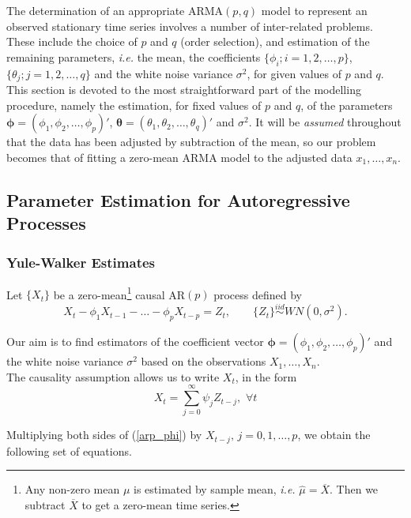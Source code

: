\documentclass[11pt, a4paper]{article}
\numberwithin{equation}{section}
\theoremstyle{definition}
\begin{document}
The determination of an appropriate ARMA$(p, q)$ model to represent an 
observed stationary time series involves a number of inter-related problems. These include the choice of $p$ and $q$ (order selection), and estimation of the remaining parameters, \textit{i.e.} the mean, the coefficients $\{\phi_i; i = 1, 2, \ldots, p\}$, $\{\theta_j; j = 1, 2, \ldots, q\}$ and the white noise variance $\sigma^2$, for given values of $p$ and $q$. This section is devoted to the most straightforward part of the modelling procedure, namely the estimation, for fixed values of $p$ and $q$, of the parameters $\boldsymbol{\phi} = (\phi_1, \phi_2, \ldots, \phi_p)'$, $\boldsymbol{\theta} = (\theta_1, \theta_2, \ldots, \theta_q)'$ and $\sigma^2$. It will be \textit{assumed} throughout that the data has been adjusted by subtraction of the mean, so our problem becomes that of fitting a zero-mean ARMA model to the adjusted data $x_1, \ldots, x_n$.

\subsection{Parameter Estimation for Autoregressive Processes}

\subsubsection{Yule-Walker Estimates}

Let $\{X_t\}$ be a zero-mean\footnote{Any non-zero mean $\mu$ is estimated by sample mean, \textit{i.e.} $\hat{\mu} = \overline{X}$. Then we subtract $\overline{X}$ to get a zero-mean time series.} causal AR$(p)$ process defined by
\begin{equation}\label{arp_phi}
X_t - \phi_1 X_{t-1} - \ldots - \phi_p X_{t-p} = Z_t, \qquad \{Z_t\} \overset{iid}{\sim} WN(0, \sigma^2).
\end{equation}

Our aim is to find estimators of the coefficient vector $\boldsymbol{\phi} = (\phi_1, \phi_2, \ldots, \phi_p)'$ and the white noise variance $\sigma^2$ based on the observations $X_1, \ldots, X_n$. \\[0.1em]

The causality assumption allows us to write $X_t$, in the form
\begin{equation}\label{arp_causality}
X_t = \sum \limits_{j = 0}^{\infty} \psi_j Z_{t-j}, \,\, \forall t
\end{equation}

Multiplying both sides of (\ref{arp_phi}) by $X_{t-j}, \, j = 0, 1, \ldots, p$, we obtain the following set of equations.
\end{document}
